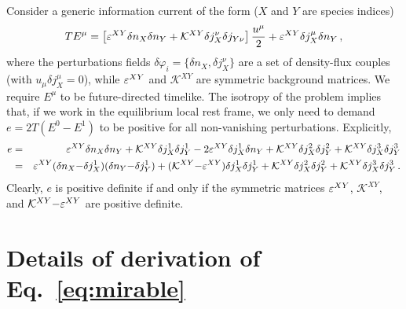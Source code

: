 \documentclass[
a4paper,
amsfonts,
amsmath,
reprint,
showkeys,
nofootinbib,
twoside,
onecolumn,
notitlepage
]{revtex4-1}
\begin{document}
	Consider a generic information current of the form ($X$ and $Y$ are species indices)
	\begin{equation}
		TE^\mu = \left[\varepsilon^{XY} \delta n_X \delta n_Y + \mathcal{K}^{XY}\delta j_X^\nu \delta j_{Y\nu}  \right] \dfrac{u^\mu}{2} + \varepsilon^{XY} \delta j_X^\mu \delta n_Y \, ,
	\end{equation}
	where the perturbations fields $\delta \varphi_i =\{\delta n_X, \delta j_X^\nu \}$ are a set of density-flux couples  (with $u_\mu \delta j_X^\mu=0$), while $\varepsilon^{XY}$ and $\mathcal{K}^{XY}$ are symmetric background matrices. 
	We require $E^\mu$ to be future-directed timelike. 
	The isotropy of the problem implies that, if we work in the equilibrium local rest frame, we only need to demand $e=2T(E^0-E^1)$ to be positive for all non-vanishing perturbations. Explicitly,
	\begin{eqnarray}
		e&=& \varepsilon^{XY} \delta n_X \delta n_Y + \mathcal{K}^{XY}\delta j_X^1 \delta j_Y^1-2\varepsilon^{XY}\delta j_X^1 \delta n_Y+\mathcal{K}^{XY}\delta j_X^2 \delta j_Y^2+\mathcal{K}^{XY}\delta j_X^3 \delta j_Y^3 \nonumber\\
		&=& \varepsilon^{XY}(\delta n_X{-}\delta j_X^1)(\delta n_Y{-}\delta j_Y^1)+(\mathcal{K}^{XY}{-}\varepsilon^{XY})\delta j_X^1 \delta j_Y^1+ \mathcal{K}^{XY}\delta j_X^2 \delta j_Y^2+\mathcal{K}^{XY}\delta j_X^3 \delta j_Y^3 \, .
	\end{eqnarray}
	Clearly, $e$ is positive definite if and only if the symmetric matrices $\varepsilon^{XY}$, $\mathcal{K}^{XY}$, and $\mathcal{K}^{XY}{-}\varepsilon^{XY}$ are positive definite.
	
	\section{Details of derivation of Eq.\ \eqref{eq:mirable}}
	\label{app:mirable}
	
\end{document}
